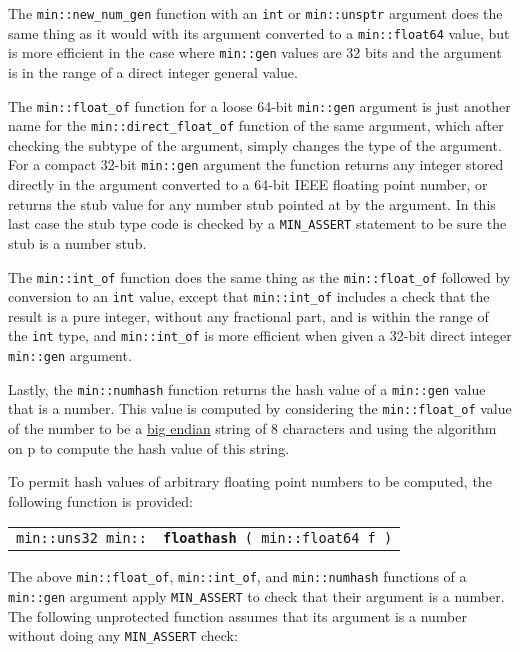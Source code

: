 \documentclass[12pt]{article}
\makeatletter
\newcommand{\ttindex}[1]{\index{#1@{\tt #1}}}
\newcommand{\minindex}[1]{\ttindex{min::#1}\ttindex{#1}}
\newcommand{\pagref}[1]{p\pageref{#1}}
\newenvironment{indpar}[1][0.3in]%
	{\begin{list}{}%
		     {\setlength{\itemsep}{0in}%
		      \setlength{\topsep}{0in}%
		      \setlength{\parsep}{1ex}%
		      \setlength{\labelwidth}{#1}%
		      \setlength{\leftmargin}{#1}%
		      \addtolength{\leftmargin}{\labelsep}}%
	 \item}%
	{\end{list}}
\newcommand{\LABEL}[1]{\label{#1}}
\newcommand{\MINKEY}[1]{{\tt \bf #1}\minindex{#1}}
\makeatother
\begin{document}
The \verb|min::new_num_gen| function with an \verb|int| or \verb|min::unsptr|
argument does the
same thing as it would with its argument converted to a \verb|min::float64|
value, but is more efficient in the case where \verb|min::gen| values
are 32 bits and the argument is in the range of a direct integer general
value.

The \verb|min::float_of| function for a loose 64-bit \verb|min::gen|
argument is just another name for the \verb|min::direct_float_of| function
of the same argument, which after checking the subtype of the argument,
simply changes the type of the argument.
For a compact 32-bit \verb|min::gen| argument the
function returns any integer stored directly
in the argument converted to a 64-bit IEEE floating point number, or
returns the stub value for any number stub pointed at by the argument.
In this last case the stub type code is checked by a \verb|MIN_ASSERT|
statement to be sure the stub is a number stub.

The \verb|min::int_of| function does the same thing as the
\verb|min::float_of| followed by conversion to an \verb|int| value,
except that \verb|min::int_of| includes a check that the result
is a pure integer, without any fractional part, and is within the
range of the \verb|int| type, and
\verb|min::int_of| is more efficient when given a 32-bit direct integer
\verb|min::gen| argument.

Lastly, the \verb|min::numhash| function
returns the hash value of a \verb|min::gen|
value that is a number.  This value is computed by considering
the \verb|min::float_of| value of the number
to be a \underline{big endian} string of 8 characters and using the algorithm
on \pagref{HASH-ALGORITHM} to compute the hash value of this string.%
\label{NUMBER-HASH-ALGORITHM}

To permit hash values of arbitrary floating point numbers to be computed,
the following function is provided:

\begin{indpar}\begin{tabular}{r@{}l}
\verb|min::uns32 min::| & \MINKEY{floathash}\verb| ( min::float64 f )|
\LABEL{MIN::FLOATHASH} \\
\end{tabular}\end{indpar}

The above \verb|min::float_of|, \verb|min::int_of|, and \verb|min::numhash|
functions of a \verb|min::gen| argument apply \verb|MIN_ASSERT| to check
that their argument is a number.  The following unprotected function assumes
that its argument is a number without doing any \verb|MIN_ASSERT| check:
\end{document}
